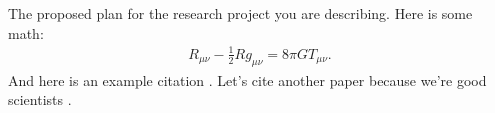 
The proposed plan for the research project you are describing.
Here is some math:
\begin{align*}
    R_{\mu\nu} - \frac{1}{2} R g_{\mu\nu} = 8 \pi G T_{\mu\nu}.  
\end{align*}
And here is an example citation \cite{paper1}.
Let's cite another paper because we're good scientists \cite{paper2}.

